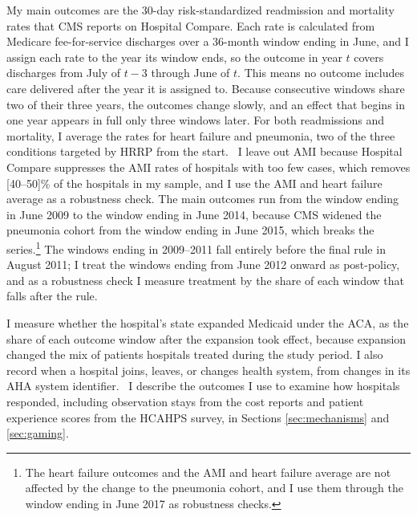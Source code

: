 \documentclass[12pt]{article}
\theoremstyle{definition}   %
\begin{document}
    My main outcomes are the 30-day risk-standardized readmission and mortality rates that CMS reports on Hospital Compare. Each rate is calculated from Medicare fee-for-service discharges over a 36-month window ending in June, and I assign each rate to the year its window ends, so the outcome in year $t$ covers discharges from July of $t-3$ through June of $t$. This means no outcome includes care delivered after the year it is assigned to. Because consecutive windows share two of their three years, the outcomes change slowly, and an effect that begins in one year appears in full only three windows later. For both readmissions and mortality, I average the rates for heart failure and pneumonia, two of the three conditions targeted by HRRP from the start.%
    \ I leave out AMI because Hospital Compare suppresses the AMI rates of hospitals with too few cases, which removes [40--50]\% of the hospitals in my sample, and I use the AMI and heart failure average as a robustness check. The main outcomes run from the window ending in June 2009 to the window ending in June 2014, because CMS widened the pneumonia cohort from the window ending in June 2015, which breaks the series.\footnote{The heart failure outcomes and the AMI and heart failure average are not affected by the change to the pneumonia cohort, and I use them through the window ending in June 2017 as robustness checks.} The windows ending in 2009--2011 fall entirely before the final rule in August 2011; I treat the windows ending from June 2012 onward as post-policy, and as a robustness check I measure treatment by the share of each window that falls after the rule.

    I measure whether the hospital's state expanded Medicaid under the ACA, as the share of each outcome window after the expansion took effect, because expansion changed the mix of patients hospitals treated during the study period. I also record when a hospital joins, leaves, or changes health system, from changes in its AHA system identifier.%
    \ I describe the outcomes I use to examine how hospitals responded, including observation stays from the cost reports and patient experience scores from the HCAHPS survey, in Sections \ref{sec:mechanisms} and \ref{sec:gaming}.
\end{document}
